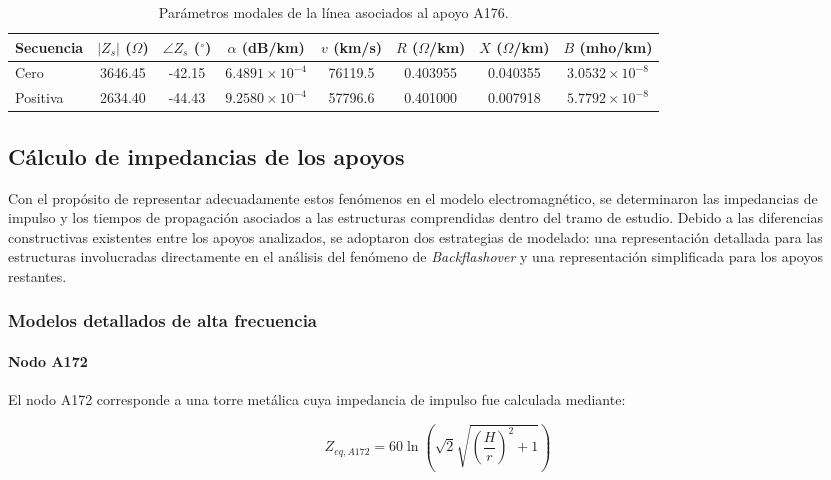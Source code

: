 \documentclass[12pt,letterpaper]{article}
\begin{document}
\begin{table}[H]
\centering
\caption{Parámetros modales de la línea asociados al apoyo A176.}
\label{tab:lcc_a176}
\renewcommand{\arraystretch}{1.2}
\begin{tabular}{lccccccc}
\toprule
Secuencia &
$\left|Z_s\right|$ ($\Omega$) &
$\angle Z_s$ ($^\circ$) &
$\alpha$ (dB/km) &
$v$ (km/s) &
$R$ ($\Omega$/km) &
$X$ ($\Omega$/km) &
$B$ (mho/km) \\
\midrule
Cero     & 3646.45 & -42.15 & $6.4891\times10^{-4}$ & 76119.5 & 0.403955 & 0.040355 & $3.0532\times10^{-8}$ \\
Positiva & 2634.40 & -44.43 & $9.2580\times10^{-4}$ & 57796.6 & 0.401000 & 0.007918 & $5.7792\times10^{-8}$ \\
\bottomrule
\end{tabular}
\end{table}

\subsection{Cálculo de impedancias de los apoyos}

Con el propósito de representar adecuadamente estos fenómenos en el modelo electromagnético, se determinaron las impedancias de impulso y los tiempos de propagación asociados a las estructuras comprendidas dentro del tramo de estudio. Debido a las diferencias constructivas existentes entre los apoyos analizados, se adoptaron dos estrategias de modelado: una representación detallada para las estructuras involucradas directamente en el análisis del fenómeno de \textit{Backflashover} y una representación simplificada para los apoyos restantes.

\subsubsection{Modelos detallados de alta frecuencia}

\paragraph{Nodo A172}

El nodo A172 corresponde a una torre metálica cuya impedancia de impulso fue calculada mediante:

\begin{equation}
Z_{eq,A172}
=
60\ln
\left(
\sqrt{2}
\sqrt{
\left(\frac{H}{r}\right)^2+1
}
\right)
\end{equation}
\end{document}
